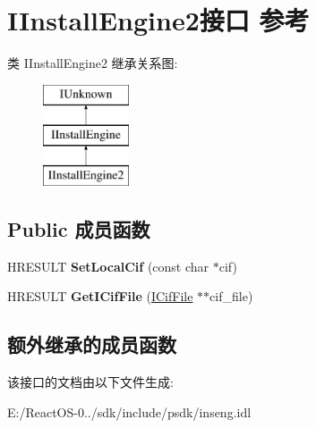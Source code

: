 \hypertarget{interface_i_install_engine2}{}\section{I\+Install\+Engine2接口 参考}
\label{interface_i_install_engine2}
类 I\+Install\+Engine2 继承关系图\+:\begin{figure}[H]
\begin{center}
\leavevmode
\includegraphics[height=3.000000cm]{interface_i_install_engine2}
\end{center}
\end{figure}
\subsection*{Public 成员函数}
\begin{DoxyCompactItemize}
\item 
\mbox{\label{interface_i_install_engine2_a84f7544c3d3654d0b572665348cdfdf5}} 
H\+R\+E\+S\+U\+LT {\bfseries Set\+Local\+Cif} (const char $\ast$cif)
\item 
\mbox{\label{interface_i_install_engine2_a4cf23e81192a54807c47e1ad0e07588e}} 
H\+R\+E\+S\+U\+LT {\bfseries Get\+I\+Cif\+File} (\hyperlink{interface_i_cif_file}{I\+Cif\+File} $\ast$$\ast$cif\+\_\+file)
\end{DoxyCompactItemize}
\subsection*{额外继承的成员函数}


该接口的文档由以下文件生成\+:\begin{DoxyCompactItemize}
\item 
E\+:/\+React\+O\+S-\/0../sdk/include/psdk/inseng.\+idl\end{DoxyCompactItemize}
